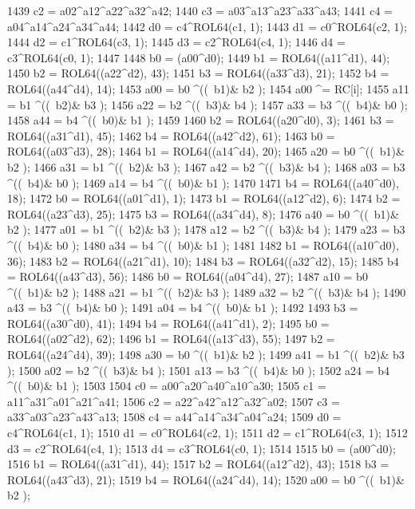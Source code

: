 \begin{DoxyCode}
1439     c2 = a02^a12^a22^a32^a42;
1440     c3 = a03^a13^a23^a33^a43;
1441     c4 = a04^a14^a24^a34^a44;
1442     d0 = c4^ROL64(c1, 1);
1443     d1 = c0^ROL64(c2, 1);
1444     d2 = c1^ROL64(c3, 1);
1445     d3 = c2^ROL64(c4, 1);
1446     d4 = c3^ROL64(c0, 1);
1447 
1448     b0 = (a00^d0);
1449     b1 = ROL64((a11^d1), 44);
1450     b2 = ROL64((a22^d2), 43);
1451     b3 = ROL64((a33^d3), 21);
1452     b4 = ROL64((a44^d4), 14);
1453     a00 =   b0 ^((~b1)&  b2 );
1454     a00 ^= RC[i];
1455     a11 =   b1 ^((~b2)&  b3 );
1456     a22 =   b2 ^((~b3)&  b4 );
1457     a33 =   b3 ^((~b4)&  b0 );
1458     a44 =   b4 ^((~b0)&  b1 );
1459 
1460     b2 = ROL64((a20^d0), 3);
1461     b3 = ROL64((a31^d1), 45);
1462     b4 = ROL64((a42^d2), 61);
1463     b0 = ROL64((a03^d3), 28);
1464     b1 = ROL64((a14^d4), 20);
1465     a20 =   b0 ^((~b1)&  b2 );
1466     a31 =   b1 ^((~b2)&  b3 );
1467     a42 =   b2 ^((~b3)&  b4 );
1468     a03 =   b3 ^((~b4)&  b0 );
1469     a14 =   b4 ^((~b0)&  b1 );
1470 
1471     b4 = ROL64((a40^d0), 18);
1472     b0 = ROL64((a01^d1), 1);
1473     b1 = ROL64((a12^d2), 6);
1474     b2 = ROL64((a23^d3), 25);
1475     b3 = ROL64((a34^d4), 8);
1476     a40 =   b0 ^((~b1)&  b2 );
1477     a01 =   b1 ^((~b2)&  b3 );
1478     a12 =   b2 ^((~b3)&  b4 );
1479     a23 =   b3 ^((~b4)&  b0 );
1480     a34 =   b4 ^((~b0)&  b1 );
1481 
1482     b1 = ROL64((a10^d0), 36);
1483     b2 = ROL64((a21^d1), 10);
1484     b3 = ROL64((a32^d2), 15);
1485     b4 = ROL64((a43^d3), 56);
1486     b0 = ROL64((a04^d4), 27);
1487     a10 =   b0 ^((~b1)&  b2 );
1488     a21 =   b1 ^((~b2)&  b3 );
1489     a32 =   b2 ^((~b3)&  b4 );
1490     a43 =   b3 ^((~b4)&  b0 );
1491     a04 =   b4 ^((~b0)&  b1 );
1492 
1493     b3 = ROL64((a30^d0), 41);
1494     b4 = ROL64((a41^d1), 2);
1495     b0 = ROL64((a02^d2), 62);
1496     b1 = ROL64((a13^d3), 55);
1497     b2 = ROL64((a24^d4), 39);
1498     a30 =   b0 ^((~b1)&  b2 );
1499     a41 =   b1 ^((~b2)&  b3 );
1500     a02 =   b2 ^((~b3)&  b4 );
1501     a13 =   b3 ^((~b4)&  b0 );
1502     a24 =   b4 ^((~b0)&  b1 );
1503 
1504     c0 = a00^a20^a40^a10^a30;
1505     c1 = a11^a31^a01^a21^a41;
1506     c2 = a22^a42^a12^a32^a02;
1507     c3 = a33^a03^a23^a43^a13;
1508     c4 = a44^a14^a34^a04^a24;
1509     d0 = c4^ROL64(c1, 1);
1510     d1 = c0^ROL64(c2, 1);
1511     d2 = c1^ROL64(c3, 1);
1512     d3 = c2^ROL64(c4, 1);
1513     d4 = c3^ROL64(c0, 1);
1514 
1515     b0 = (a00^d0);
1516     b1 = ROL64((a31^d1), 44);
1517     b2 = ROL64((a12^d2), 43);
1518     b3 = ROL64((a43^d3), 21);
1519     b4 = ROL64((a24^d4), 14);
1520     a00 =   b0 ^((~b1)&  b2 );

\end{DoxyCode}

